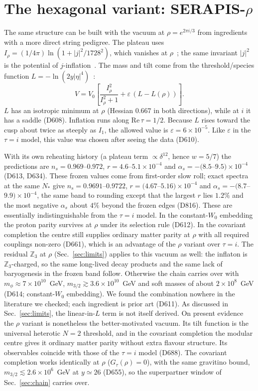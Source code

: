 \documentclass[aps,prd,twocolumn,superscriptaddress,nofootinbib,floatfix]{revtex4-2}
\begin{document}
\section{The hexagonal variant: SERAPIS-$\rho$}\label{sec:rho}
The same structure can be built with the vacuum at $\rho = e^{2\pi i/3}$ from ingredients with a more direct string pedigree. The plateau uses $I_\rho = (1/4\pi)\ln(1+|j|^2/1728^2)$, which vanishes at $\rho$~\cite{arXiv_2408_05203}; the same invariant $|j|^2$ is the potential of $j$-inflation~\cite{arXiv_1612_09559}. The mass and tilt come from the threshold/species function $L = -\ln(2y|\eta|^4)$~\cite{arXiv_2407_12081,arXiv_2411_08467}:
\begin{equation}
V = V_0\left[\frac{I_\rho^2}{I_\rho^2+1} + \varepsilon\,(L - L(\rho))\right].
\end{equation}
$L$ has an isotropic minimum at $\rho$ (Hessian $0.667$ in both directions), while at $i$ it has a saddle (D608). Inflation runs along $\mathrm{Re}\,\tau = 1/2$. Because $L$ rises toward the cusp about twice as steeply as $I_1$, the allowed value is $\varepsilon = 6\times10^{-5}$. Like $\varepsilon$ in the $\tau = i$ model, this value was chosen after seeing the data (D610).

With its own reheating history (a plateau term $\propto\delta^{12}$, hence $w = 5/7$) the predictions are $n_s = 0.969$--$0.972$, $r = 4.6$--$5.1\times10^{-4}$ and $\alpha_s = -(8.5$--$9.5)\times10^{-4}$ (D613, D634). These frozen values come from first-order slow roll; exact spectra at the same $N_*$ give $n_s=0.9691$--$0.9722$, $r=(4.67$--$5.16)\times10^{-4}$ and $\alpha_s=-(8.7$--$9.9)\times10^{-4}$, the same band to rounding except that the largest $r$ lies $1.2\%$ and the most negative $\alpha_s$ about $4\%$ beyond the frozen edges (D816). These are essentially indistinguishable from the $\tau = i$ model. In the constant-$W_0$ embedding the proton parity survives at $\rho$ under its selection rule (D612). In the covariant completion the centre still supplies ordinary matter parity at $\rho$ with all required couplings non-zero (D661), which is an advantage of the $\rho$ variant over $\tau=i$. The residual $\mathbb{Z}_3$ at $\rho$ (Sec.~\ref{sec:limits}) applies to this vacuum as well: the inflaton is $\mathbb{Z}_3$-charged, so the same long-lived decay products and the same lack of baryogenesis in the frozen band follow. Otherwise the chain carries over with $m_\phi \approx 7\times10^{10}$~GeV, $m_{3/2} \gtrsim 3.6\times10^{10}$~GeV and soft masses of about $2\times10^8$~GeV (D614; constant-$W_0$ embedding). We found the combination nowhere in the literature we checked; each ingredient is prior art (D611). As discussed in Sec.~\ref{sec:limits}, the linear-in-$L$ term is not itself derived. On present evidence the $\rho$ variant is nonetheless the better-motivated vacuum. Its tilt function is the universal heterotic $N=2$ threshold, and in the covariant completion the modular centre gives it ordinary matter parity without extra flavour structure. Its observables coincide with those of the $\tau=i$ model (D688). The covariant completion works identically at $\rho$ ($G_\tau(\rho)=0$), with the same gravitino bound, $m_{3/2}\lesssim2.6\times10^6$~GeV at $y\simeq26$ (D655), so the superpartner window of Sec.~\ref{sec:chain} carries over.
\end{document}

